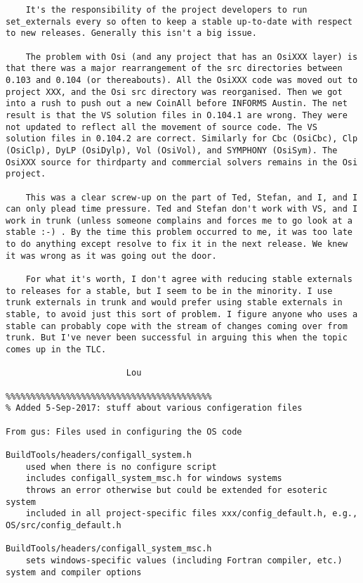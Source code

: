 \begin{verbatim}
    It's the responsibility of the project developers to run set_externals every so often to keep a stable up-to-date with respect to new releases. Generally this isn't a big issue.

    The problem with Osi (and any project that has an OsiXXX layer) is that there was a major rearrangement of the src directories between 0.103 and 0.104 (or thereabouts). All the OsiXXX code was moved out to project XXX, and the Osi src directory was reorganised. Then we got into a rush to push out a new CoinAll before INFORMS Austin. The net result is that the VS solution files in O.104.1 are wrong. They were not updated to reflect all the movement of source code. The VS solution files in 0.104.2 are correct. Similarly for Cbc (OsiCbc), Clp (OsiClp), DyLP (OsiDylp), Vol (OsiVol), and SYMPHONY (OsiSym). The OsiXXX source for thirdparty and commercial solvers remains in the Osi project.

    This was a clear screw-up on the part of Ted, Stefan, and I, and I can only plead time pressure. Ted and Stefan don't work with VS, and I work in trunk (unless someone complains and forces me to go look at a stable :-) . By the time this problem occurred to me, it was too late to do anything except resolve to fix it in the next release. We knew it was wrong as it was going out the door.

    For what it's worth, I don't agree with reducing stable externals to releases for a stable, but I seem to be in the minority. I use trunk externals in trunk and would prefer using stable externals in stable, to avoid just this sort of problem. I figure anyone who uses a stable can probably cope with the stream of changes coming over from trunk. But I've never been successful in arguing this when the topic comes up in the TLC.

                        Lou

%%%%%%%%%%%%%%%%%%%%%%%%%%%%%%%%%%%%%%%%%
% Added 5-Sep-2017: stuff about various configeration files

From gus: Files used in configuring the OS code

BuildTools/headers/configall_system.h
    used when there is no configure script 
    includes configall_system_msc.h for windows systems
    throws an error otherwise but could be extended for esoteric system
    included in all project-specific files xxx/config_default.h, e.g., OS/src/config_default.h

BuildTools/headers/configall_system_msc.h
    sets windows-specific values (including Fortran compiler, etc.) system and compiler options 


\end{verbatim}
